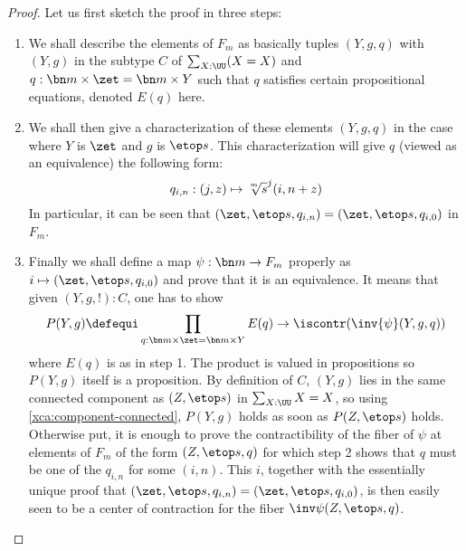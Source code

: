 \begin{proof}
  Let us first sketch the proof in three steps:
  \begin{enumerate}[label={\sc Step \arabic*}.]
  \item We shall describe the elements of $F_m$ as basically tuples
    $(Y,g,q)$ with $(Y,g)$ in the subtype $C$ of $\sum_{X:\UU}(X=X)$
    and $q:\bn m\times \zet = \bn m\times Y$ such that $q$ satisfies
    certain propositional equations, denoted $E(q)$ here.
  \item We shall then give a characterization of these elements
    $(Y,g,q)$ in the case where $Y$ is $\zet$ and $g$ is $\etop
    s$. This characterization will give $q$ (viewed as an equivalence)
    the following form:
    \begin{displaymath}
      q_{i,n}: (j,z) \mapsto {\sqrt[\uproot{2}m]s}^j(i,n+z)
    \end{displaymath}
    In particular, it can be seen that
    $(\zet,\etop s,q_{i,n}) = (\zet,\etop s,q_{i,0})$ in $F_m$.
  \item Finally we shall define a map $\psi: \bn m \to F_m$ properly
    as $i\mapsto (\zet,\etop s,q_{i,0})$ and prove that it is an
    equivalence. It means that given $(Y,g,!):C$, one has to show
    \begin{displaymath}
      P(Y,g) \defequi \prod_{q:\bn m \times \zet = \bn m \times Y}E(q)\to\iscontr(\inv{\psi}(Y,g,q))
    \end{displaymath}
    where $E(q)$ is as in step 1. The product is valued in
    propositions so $P(Y,g)$ itself is a proposition. By definition of
    $C$, $(Y,g)$ lies in the same connected component as $(Z,\etop s)$
    in $\sum_{X:\UU}X=X$, so using \cref{xca:component-connected},
    $P(Y,g)$ holds as soon as $P(Z,\etop s)$ holds. Otherwise put, it
    is enough to prove the contractibility of the fiber of $\psi$ at
    elements of $F_m$ of the form $(Z,\etop s,q)$ for which step 2
    shows that $q$ must be one of the $q_{i,n}$ for some $(i,n)$. This
    $i$, together with the essentially unique proof that
    $(\zet,\etop s, q_{i,n}) = (\zet,\etop s, q_{i,0})$, is then
    easily seen to be a center of contraction for the fiber
    $\inv\psi(Z,\etop s, q)$.
  \end{enumerate}


\end{proof}
